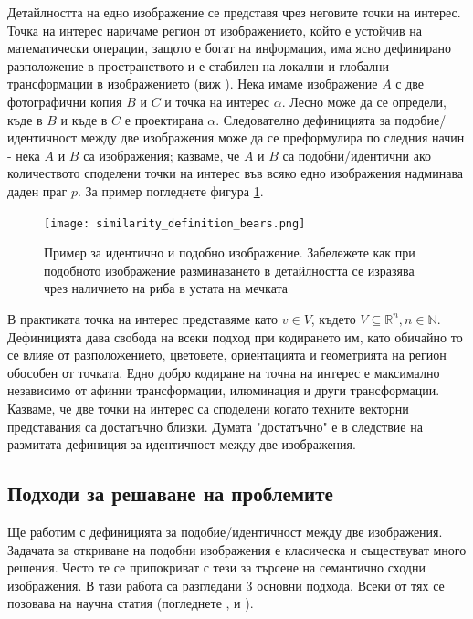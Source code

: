 \documentclass[a4paper,12pt]{article}
\begin{document}
\label{def:imdetail}Детайлността на едно изображение се представя чрез неговите точки на интерес. Точка на интерес наричаме регион от изображението, който е устойчив на математически операции, защото е богат на информация, има ясно дефинирано разположение в пространството и е стабилен на локални и глобални трансформации в изображението (виж \cite{sift}). Нека имаме изображение $A$ с две фотографични копия $B$ и $C$ и точка на интерес $\alpha$. Лесно може да се определи, къде в $B$ и къде в $C$ е проектирана $\alpha$. Следователно дефиницията за подобие/идентичност между две изображения може да се преформулира по следния начин - нека $A$ и $B$ са изображения; казваме, че $A$ и $B$ са подобни/идентични ако количеството споделени точки на интерес във всяко едно изображения надминава даден праг $p$. За пример погледнете фигура \ref{fig:similaritydefbears}.

\begin{figure}[h]
    \centering
    \texttt{[image: similarity\_definition\_bears.png]}
    \caption{Пример за идентично и подобно изображение. Забележете как при подобното изображение разминаването в детайлността се изразява чрез наличието на риба в устата на мечката}
    \label{fig:similaritydefbears}
\end{figure}

\bigbreak

В практиката точка на интерес представяме като $v \in V$, където $V \subseteq \mathbb{R}^n, n \in \mathbb{N}$. Дефиницията дава свобода на всеки подход при кодирането им, като обичайно то се влияе от разположението, цветовете, ориентацията и геометрията на регион обособен от точката. Едно добро кодиране на точна на интерес е максимално независимо от афинни трансформации, илюминация и други трансформации. Казваме, че две точки на интерес са споделени когато техните векторни представания са достатъчно близки. Думата "достатъчно" е в следствие на размитата дефиниция за идентичност между две изображения.

\subsection{Подходи за решаване на проблемите}

Ще работим с дефиницията за подобие/идентичност между две изображения. Задачата за откриване на подобни изображения е класическа и съществуват много решения. Често те се припокриват с тези за търсене на семантично сходни изображения. В тази работа са разгледани 3 основни подхода. Всеки от тях се позовава на научна статия (погледнете \cite{spinimages}, \cite{sift} и \cite{vocabularytree}).
\end{document}
